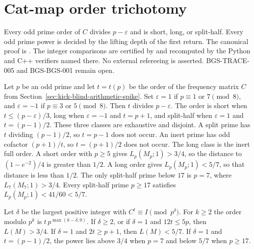 \section{Cat-map order trichotomy}
\label{sec:order-trichotomy-abel}
Every odd prime order of \(C\) divides \(p-\varepsilon\) and is short, long,
or split-half. Every odd prime power is decided by the lifting depth of
the first return. The canonical proof is
.
The integer comparisons are certified by
 and recomputed by the
Python and C++ verifiers named there. No external refereeing is asserted.
BGS-TRACE-005 and BGS-BGS-001 remain open.

\begin{theorem}
\label{thm:order-trichotomy-abel}
Let \(p\) be an odd prime and let \(t=t(p)\) be the order of the frequency
matrix \(C\) from Section~\ref{sec:kick-blind-arithmetic-spike}. Set
\(\varepsilon=1\) if \(p\equiv1\) or \(7\pmod8\), and \(\varepsilon=-1\) if
\(p\equiv3\) or \(5\pmod8\). Then \(t\) divides \(p-\varepsilon\). The
order is short when \(t\le(p-\varepsilon)/3\), long when \(\varepsilon=-1\)
and \(t=p+1\), and split-half when
\(\varepsilon=1\) and \(t=(p-1)/2\). These three classes are exhaustive and
disjoint. A split prime has \(t\) dividing \((p-1)/2\), so \(t=p-1\) does
not occur. An inert prime has odd cofactor \((p+1)/t\), so
\(t=(p+1)/2\) does not occur. The long class is the inert full order. A short order with \(p\ge5\) gives \(L_p(M_p;1)>3/4\), so the
distance to \((1-e^{-2})/4\) is greater than \(1/2\). A long order gives
\(L_p(M_p;1)<5/7\), so that distance is less than \(1/2\). The only
split-half prime below \(17\) is \(p=7\), where \(L_7(M_7;1)>3/4\). Every
split-half prime \(p\ge17\) satisfies \(L_p(M_p;1)<41/60<5/7\).

Let \(\delta\) be the largest positive integer with
\(C^{t}\equiv I\pmod{p^\delta}\). For \(k\ge2\) the order modulo \(p^k\)
is \(t\,p^{\max(k-\delta,0)}\). If \(\delta\ge2\), or if \(\delta=1\) and
\(12t\le5p\), then \(L(M)>3/4\). If \(\delta=1\) and \(2t\ge p+1\), then
\(L(M)<5/7\). If \(\delta=1\) and \(t=(p-1)/2\), the power lies above
\(3/4\) when \(p=7\) and below \(5/7\) when \(p\ge17\).


\end{theorem}
